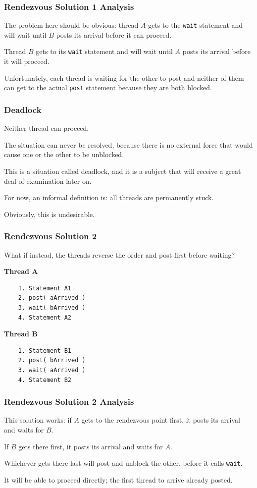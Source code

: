 \begin{frame}
	\frametitle{Rendezvous Solution 1 Analysis}

	The problem here should be obvious: thread $A$ gets to the \texttt{wait} statement and will wait until $B$ posts its arrival before it can proceed.

	Thread $B$ gets to its \texttt{wait} statement and will wait until $A$ posts its arrival before it will proceed.

	Unfortunately, each thread is waiting for the other to post and neither of them can get to the actual \texttt{post} statement because they are both blocked.


\end{frame}

\begin{frame}
	\frametitle{Deadlock}

	Neither thread can proceed.

	The situation can never be resolved, because there is no external force that would cause one or the other to be unblocked.

	This is a situation called \alert{deadlock}, and it is a subject that will receive a great deal of examination later on.

	For now, an informal definition is: all threads are permanently stuck.

	Obviously, this is undesirable.

\end{frame}

\begin{frame}[fragile]
	\frametitle{Rendezvous Solution 2}

	What if instead, the threads reverse the order and post first before waiting?

	\begin{multicols}{2}
		\textbf{Thread A}
		\begin{verbatim}
	1. Statement A1
	2. post( aArrived )
	3. wait( bArrived )
	4. Statement A2
  \end{verbatim}
		\columnbreak
		\textbf{Thread B}
		\begin{verbatim}
	1. Statement B1
	2. post( bArrived )
	3. wait( aArrived )
	4. Statement B2
  \end{verbatim}
	\end{multicols}
	\vspace{-2em}


\end{frame}

\begin{frame}
	\frametitle{Rendezvous Solution 2 Analysis}

	This solution works: if $A$ gets to the rendezvous point first, it posts its arrival and waits for $B$.

	If $B$ gets there first, it posts its arrival and waits for $A$.

	Whichever gets there last will post and unblock the other, before it calls \texttt{wait}.

	It will be able to proceed directly; the first thread to arrive already posted.


\end{frame}

